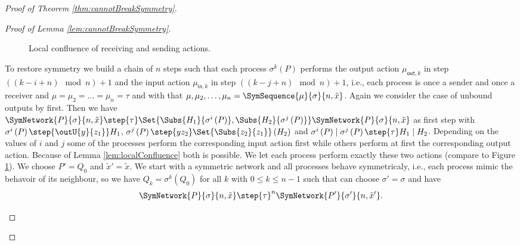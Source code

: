 \documentclass[11pt,techReport]{eptcs}
\begin{document}
\begin{proof}[Proof of Theorem \ref{thm:cannotBreakSymmetry}]
\begin{proof}[Proof of Lemma \ref{lem:cannotBreakSymmetry}]
\begin{description}
\begin{figure}[ht]
\begin{center}
				\end{center}
				\caption{Local confluence of receiving and sending actions.} \label{fig:confluence}
			\end{figure}
			To restore symmetry we build a chain of $ n $ steps such that each process $ \sigma^k\left( P \right) $ performs the output action $ \mu_{\mathsf{out}, k} $ in step $ \left( \left( k{-}i{+}n \right) \!\!\! \mod n \right){+}1 $ and the input action $ \mu_{\mathsf{in}, k} $ in step $ \left( \left( k{-}j{+}n \right) \!\!\! \mod n \right){+}1 $, i.e., each process is once a sender and once a receiver and $ \mu = \mu_2 = \ldots = \mu_n = \tau $ and with that $ \mu, \mu_2, \ldots, \mu_n = \SymSequence{\mu}{\sigma}{n, \tilde{x}} $. Again we consider the case of unbound outputs by first. Then we have $ \SymNetwork{P}{\sigma}{n, \tilde{x}} \step{\tau} \Set{ \Subs{H_1}{\sigma^i\left( P \right)}, \Subs{H_2}{\sigma^j\left( P \right)} }\SymNetwork{P}{\sigma}{n, \tilde{x}} $ as first step with $ \sigma^i\left( P \right) \step{\outU{y}{z_1}} H_1 $, $ \sigma^j\left( P \right) \step{y z_2} \Set{ \Subs{z_2}{z_1} }\left( H_2 \right) $ and $ \sigma^i\left( P \right) \mid \sigma^j\left( P \right) \step{\tau} H_1 \mid H_2 $. Depending on the values of $ i $ and $ j $ some of the processes perform the corresponding input action first while others perform at first the corresponding output action. Because of Lemma \ref{lem:localConfluence} both is possible. We let each process perform exactly these two actions (compare to Figure \ref{fig:confluence}). We choose $ P' = Q_0 $ and $ \tilde{x}' = \tilde{x} $. We start with a symmetric network and all processes behave symmetricaly, i.e., each process mimic the behavoir of its neighbour, so we have $ Q_k = \sigma^k\left( Q_0 \right) $ for all $ k $ with $ 0 \leq k \leq n{-}1 $ such that can choose $ \sigma' = \sigma $ and have
			\begin{align*}
				\SymNetwork{P}{\sigma}{n, \tilde{x}} \step{\tau}^n \SymNetwork{P'}{\sigma'}{n, \tilde{x}'} \text{.}
			\end{align*}
			

\end{description}
\end{proof}
\end{proof}
\end{document}
